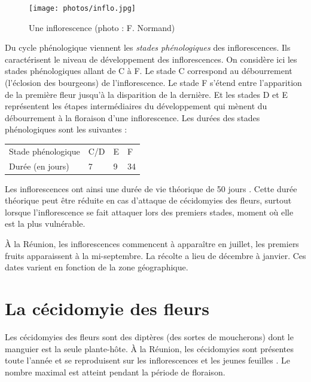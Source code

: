 \begin{figure}[ht]
 \centering
 \texttt{[image: photos/inflo.jpg]}
 \caption{Une inflorescence (photo : F. Normand)}
 \label{fig:inflo}
\end{figure}




Du cycle phénologique viennent les \emph{stades phénologiques} des inflorescences.
Ils caractérisent le niveau de développement des inflorescences.
On considère ici les stades phénologiques allant de C à F.
Le stade C correspond au débourrement (l'éclosion des bourgeons) de l'inflorescence.
Le stade F s'étend entre l'apparition de la première fleur jusqu'à la disparition de la dernière.
Et les stades D et E représentent les étapes intermédiaires du développement qui mènent du débourrement à la floraison d'une inflorescence.
Les durées des stades phénologiques sont les suivantes :
\begin{center}
\begin{tabular}{llll}
Stade phénologique & C/D & E & F\\
Durée (en jours) & 7 & 9 & 34
\end{tabular}
\end{center}
Les inflorescences ont ainsi une durée de vie théorique de 50 jours \citep{laurie}.
Cette durée théorique peut être réduite en cas d'attaque de cécidomyies des fleurs, surtout lorsque l'inflorescence se fait attaquer lors des premiers stades, moment où elle est la plus vulnérable.

À la Réunion, les inflorescences commencent à apparaître en juillet, les premiers fruits apparaissent à la mi-septembre. 
La récolte a lieu de décembre à janvier.
Ces dates varient en fonction de la zone géographique.






\section{La cécidomyie des fleurs}
\label{chap:cecido}

Les cécidomyies des fleurs sont des diptères (des sortes de moucherons) dont le manguier est la seule plante-hôte.
À la Réunion, les cécidomyies sont présentes toute l'année et se reproduisent sur les inflorescences et les jeunes feuilles \citep{paul}.
Le nombre maximal est atteint pendant la période de floraison.


